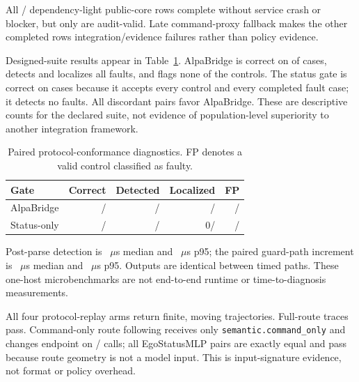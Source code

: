 \documentclass[a4paper,10pt,conference]{ieeeconf}
\begin{document}
All \CVMPublicCoreCompletedRuns{}/\CVMPublicCoreRows{} dependency-light public-core rows
complete without service crash or blocker, but only
\CVMPublicCoreAuditValidRuns{} are audit-valid. Late command-proxy fallback makes the
other completed rows integration/evidence failures rather than policy evidence.

Designed-suite results appear in Table~\ref{tab:diagnostic-comparison}. AlpaBridge is
correct on \CVMWODDiagnosticCorrect{} of \CVMDiagnosticCases{} cases, detects and
localizes all \CVMDiagnosticFaultCases{} faults, and flags none of the
\CVMDiagnosticControlCases{} controls. The status gate is correct on
\CVMStatusDiagnosticCorrect{} cases because it accepts every control and every
completed fault case; it detects no faults. All
\CVMDiagnosticDiscordantPairs{} discordant pairs favor AlpaBridge. These are descriptive
counts for the declared suite, not evidence of population-level superiority to another
integration framework.

\begin{table}[t]
\centering
\caption{Paired protocol-conformance diagnostics. FP denotes a valid control classified
as faulty.}
\label{tab:diagnostic-comparison}
\begin{tabular}{lrrrr}
\toprule
Gate & Correct & Detected & Localized & FP \\
\midrule
AlpaBridge & \CVMWODDiagnosticCorrect{}/\CVMDiagnosticCases{} &
\CVMWODDiagnosticFaultDetected{}/\CVMDiagnosticFaultCases{} &
\CVMWODDiagnosticLocalized{}/\CVMDiagnosticFaultCases{} &
\CVMWODDiagnosticFalsePositives{}/\CVMDiagnosticControlCases{} \\
Status-only & \CVMStatusDiagnosticCorrect{}/\CVMDiagnosticCases{} &
\CVMStatusDiagnosticFaultDetected{}/\CVMDiagnosticFaultCases{} &
0/\CVMDiagnosticFaultCases{} &
\CVMStatusDiagnosticFalsePositives{}/\CVMDiagnosticControlCases{} \\
\bottomrule
\end{tabular}
\end{table}

Post-parse detection is \CVMDetectorDecisionMedianUs{}~$\mu$s median and
\CVMDetectorDecisionNinetyFifthUs{}~$\mu$s p95; the paired guard-path increment is
\CVMAdapterGuardIncrementMedianUs{}~$\mu$s median and
\CVMAdapterGuardIncrementNinetyFifthUs{}~$\mu$s p95. Outputs are identical between
timed paths. These one-host microbenchmarks are not end-to-end runtime or
time-to-diagnosis measurements.

All four protocol-replay arms return \CVMReplayDriveRPCsPerArm{} finite, moving
trajectories. Full-route traces pass. Command-only route following receives only
\texttt{semantic.command\_only} and changes endpoint on
\CVMReplayRouteEndpointChanged{}/\CVMReplayDriveRPCsPerArm{} calls; all
\CVMReplayLearnedDriveRPCsPerArm{} EgoStatusMLP pairs are exactly equal and pass because
route geometry is not a model input. This is input-signature evidence, not format or
policy overhead.
\end{document}
